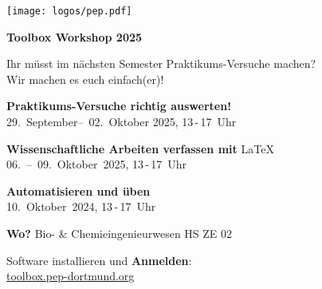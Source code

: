 \documentclass[paper=landscape]{scrartcl}
\begin{document}
  \begin{minipage}{0.25\textwidth}%
    \texttt{[image: logos/pep.pdf]}%
  \end{minipage}%
  \begin{minipage}{0.75\textwidth}%
    \centering\fontsize{50}{60}\bfseries\selectfont Toolbox Workshop 2025%
  \end{minipage}%

  \vspace{0.3cm}

  \begin{center}
    \Huge Ihr müsst im nächsten Semester Praktikums-Versuche machen? \\[0.3\baselineskip]
    Wir machen es euch einfach(er)!
  \end{center}

 \vspace{0.1cm}

  \begin{center}
    \huge \textbf{Praktikums-Versuche richtig auswerten!} \\[0.3\baselineskip]
    29.~September–~02.~Oktober 2025, 13\,-\,17~Uhr
  \end{center}
  \vspace{0.1cm}
  \begin{center}
    \huge \textbf{Wissenschaftliche Arbeiten verfassen mit} \textrm{\LaTeX}\\[0.3\baselineskip]
    06.~–~09.~Oktober~2025, 13\,-\,17~Uhr
  \end{center}
  \vspace{0.1cm}
  \begin{center}
    \huge \textbf{Automatisieren und üben}\\[0.3\baselineskip]
    10.~Oktober~2024, 13\,-\,17~Uhr
  \end{center}
  \vspace{0.1cm}
  \begin{center}
    \huge \textbf{Wo?}
    Bio- \& Chemieingenieurwesen HS ZE 02
  \end{center}
  \vspace{0.1cm}
  \begin{center}
    \large Software installieren und \textbf{Anmelden}: \\
    \Huge \href{https://toolbox.pep-dortmund.org}{toolbox.pep-dortmund.org}
  \end{center}
\end{document}
